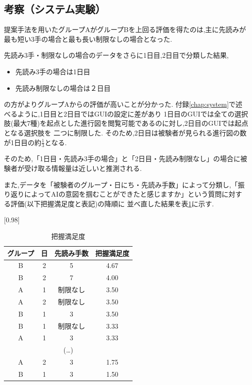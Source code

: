 \subsection{考察（システム実験）}


提案手法を用いたグループAがグループBを上回る評価を得たのは,主に先読みが最も短い3手の場合と最も長い制限なしの場合となった.

先読み3手・制限なしの場合のデータをさらに1日目,2日目で分類した結果,
\begin{itemize}
    \item 先読み3手の場合は1日目
    \item 先読み制限なしの場合は２日目
\end{itemize}

の方がよりグループAからの評価が高いことが分かった.
付録\ref{chap:system}で述べるように,1日目と2日目ではGUIの設定に差があり
1日目のGUIでは全ての選択肢(最大7種)を起点とした進行図を閲覧可能であるのに対し,2日目のGUIでは起点となる選択肢を
二つに制限した.
そのため,2日目は被験者が見られる進行図の数が1日目の約$\frac{1}{3}$となる.

そのため,「1日目・先読み3手の場合」と「2日目・先読み制限なし」の場合に被験者が受け取る情報量は近しいと推測される.

また,データを「被験者のグループ・日にち・先読み手数」によって分類し,「振り返りによってAIの意図を掴むことができたと感じますか」という質問に対する評価(以下把握満足度と表記)の降順に
並べ直した結果を表\ref{table:order}に示す.
\begin{table}[H]
	\caption{把握満足度}
    \label{table:order}
    \scriptsize
	\centering
	\scalebox{0.98}[0.98]{
		\begin{tabular}{c|c|c||c}
			グループ& 日 & 先読み手数 &把握満足度 \\ \hline
			B & 2 & 5 & 4.67\\
            B & 2 & 7 & 4.00\\
            A & 1 & 制限なし& 3.50\\
            A & 2 & 制限なし& 3.50\\
            B & 1 & 3& 3.50\\
            B & 1 & 制限なし& 3.33\\
            A & 1 & 3& 3.33\\
            \multicolumn{4}{c}{(\ldots)}\\
            A & 2 & 3 & 1.75\\
            B & 1 & 3 & 1.50\\

		\end{tabular}
	}
	
\end{table}


